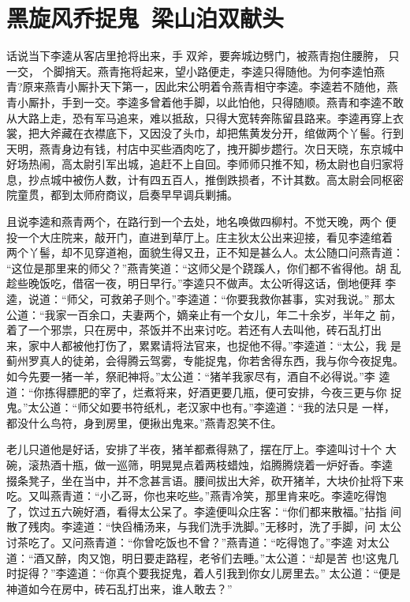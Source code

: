 \chapter{黑旋风乔捉鬼~梁山泊双献头}

话说当下李逵从客店里抢将出来，手双斧，要奔城边劈门，被燕青抱住腰胯，
只一交，个脚捎天。燕青拖将起来，望小路便走，李逵只得随他。为何李逵怕燕
青?原来燕青小厮扑天下第一，因此宋公明着令燕青相守李逵。李逵若不随他，燕
青小厮扑，手到一交。李逵多曾着他手脚，以此怕他，只得随顺。燕青和李逵不敢
从大路上走，恐有军马追来，难以抵敌，只得大宽转奔陈留县路来。李逵再穿上衣
裳，把大斧藏在衣襟底下，又因没了头巾，却把焦黄发分开，绾做两个丫髻。行到
天明，燕青身边有钱，村店中买些酒肉吃了，拽开脚步趱行。次日天晓，东京城中
好场热闹，高太尉引军出城，追赶不上自回。李师师只推不知，杨太尉也自归家将
息，抄点城中被伤人数，计有四五百人，推倒跌损者，不计其数。高太尉会同枢密
院童贯，都到太师府商议，启奏早早调兵剿捕。

且说李逵和燕青两个，在路行到一个去处，地名唤做四柳村。不觉天晚，两个
便投一个大庄院来，敲开门，直进到草厅上。庄主狄太公出来迎接，看见李逵绾着
两个丫髻，却不见穿道袍，面貌生得又丑，正不知是甚么人。太公随口问燕青道：
“这位是那里来的师父？”燕青笑道：“这师父是个跷蹊人，你们都不省得他。胡
乱趁些晚饭吃，借宿一夜，明日早行。”李逵只不做声。太公听得这话，倒地便拜
李逵，说道：“师父，可救弟子则个。”李逵道：“你要我救你甚事，实对我说。”
那太公道：“我家一百余口，夫妻两个，嫡亲止有一个女儿，年二十余岁，半年之
前，着了一个邪祟，只在房中，茶饭并不出来讨吃。若还有人去叫他，砖石乱打出
来，家中人都被他打伤了，累累请将法官来，也捉他不得。”李逵道：“太公，我
是蓟州罗真人的徒弟，会得腾云驾雾，专能捉鬼，你若舍得东西，我与你今夜捉鬼。
如今先要一猪一羊，祭祀神将。”太公道：“猪羊我家尽有，酒自不必得说。”李
逵道：“你拣得膘肥的宰了，烂煮将来，好酒更要几瓶，便可安排，今夜三更与你
捉鬼。”太公道：“师父如要书符纸札，老汉家中也有。”李逵道：“我的法只是
一样，都没什么鸟符，身到房里，便揪出鬼来。”燕青忍笑不住。

老儿只道他是好话，安排了半夜，猪羊都煮得熟了，摆在厅上。李逵叫讨十个
大碗，滚热酒十瓶，做一巡筛，明晃晃点着两枝蜡烛，焰腾腾烧着一炉好香。李逵
掇条凳子，坐在当中，并不念甚言语。腰间拔出大斧，砍开猪羊，大块价扯将下来
吃。又叫燕青道：“小乙哥，你也来吃些。”燕青冷笑，那里肯来吃。李逵吃得饱
了，饮过五六碗好酒，看得太公呆了。李逵便叫众庄客：“你们都来散福。”拈指
间散了残肉。李逵道：“快舀桶汤来，与我们洗手洗脚。”无移时，洗了手脚，问
太公讨茶吃了。又问燕青道：“你曾吃饭也不曾？”燕青道：“吃得饱了。”李逵
对太公道：“酒又醉，肉又饱，明日要走路程，老爷们去睡。”太公道：“却是苦
也!这鬼几时捉得？”李逵道：“你真个要我捉鬼，着人引我到你女儿房里去。”
太公道：“便是神道如今在房中，砖石乱打出来，谁人敢去？”

